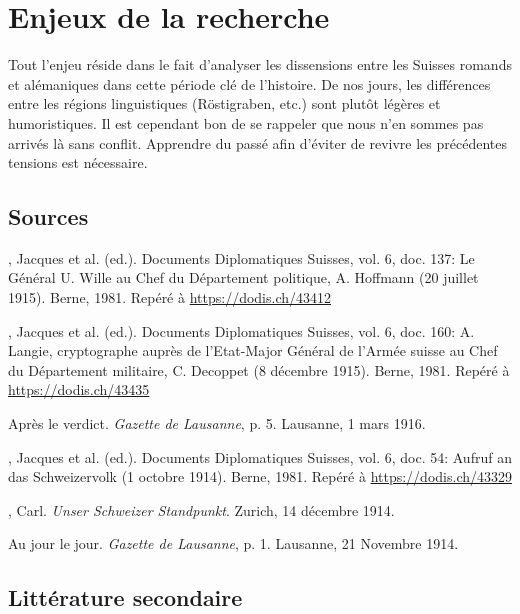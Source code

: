 \documentclass[french,a4paper]{article}
\begin{document}
\section*{Enjeux de la recherche}

Tout l'enjeu réside dans le fait d'analyser les dissensions entre les Suisses romands et alémaniques dans cette période clé de l'histoire.
De nos jours, les différences entre les régions linguistiques (Röstigraben, etc.) sont plutôt légères et humoristiques.
Il est cependant bon de se rappeler que nous n'en sommes pas arrivés là sans conflit.
Apprendre du passé afin d'éviter de revivre les précédentes tensions est nécessaire.

\begin{thebibliography}{9}

\subsection*{Sources}

, Jacques et al. (ed.). Documents Diplomatiques Suisses, vol. 6, doc. 137: \og Le Général U. Wille au Chef du Département politique, A. Hoffmann \fg{} (20 juillet 1915). Berne, 1981. Repéré à \url{https://dodis.ch/43412}

, Jacques et al. (ed.). Documents Diplomatiques Suisses, vol. 6, doc. 160: \og A. Langie, cryptographe auprès de l'Etat-Major Général de l'Armée suisse au Chef du Département militaire, C. Decoppet \fg{} (8 décembre 1915). Berne, 1981. Repéré à \url{https://dodis.ch/43435}

Après le verdict. \textit{Gazette de Lausanne}, p. 5. Lausanne, 1\ier{} mars 1916.

, Jacques et al. (ed.). Documents Diplomatiques Suisses, vol. 6, doc. 54: \og Aufruf an das Schweizervolk \fg{} (1\ier{} octobre 1914). Berne, 1981. Repéré à \url{https://dodis.ch/43329}

, Carl.
\textit{Unser Schweizer Standpunkt}. Zurich, 14 décembre 1914.

Au jour le jour. \textit{Gazette de Lausanne}, p. 1. Lausanne, 21 Novembre 1914.

\subsection*{Littérature secondaire}


\end{thebibliography}
\end{document}
